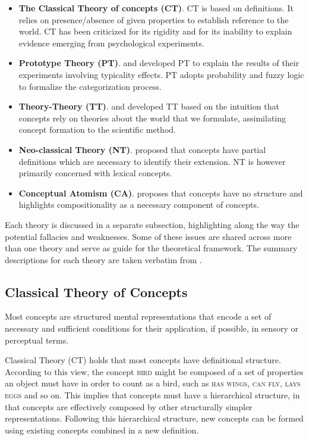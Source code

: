 \begin{itemize}
	\item \textbf{The Classical Theory of concepts (CT)}. CT is based on definitions. It relies on presence/absence of given properties to establish reference to the world. CT has been criticized for its rigidity and for its inability to explain evidence emerging from psychological experiments. 
	\item \textbf{Prototype Theory (PT)}. \cite{Rosch1978} and \cite{Smith1981} developed PT to explain the results of their experiments involving typicality effects. PT adopts probability and fuzzy logic to formalize the categorization process. 
	\item \textbf{Theory-Theory (TT)}. \cite{Murphy1985} and \cite{Carey1991, Carey2009} developed TT based on the intuition that concepts rely on theories about the world that we formulate, assimilating concept formation to the scientific method.
	\item \textbf{Neo-classical Theory (NT)}. \cite{Jackendoff1989} proposed that concepts have partial definitions which are necessary to identify their extension. NT is however primarily concerned with lexical concepts.
	\item \textbf{Conceptual Atomism (CA)}. \cite{Fodor2008} proposes that concepts have no structure and highlights  compositionality as a necessary component of concepts.
\end{itemize}

Each theory is discussed in a separate subsection, highlighting along the way the potential fallacies and weaknesses. Some of these issues are shared across more than one theory and serve as guide for the theoretical framework. The summary descriptions for each theory are taken verbatim from \cite{Laurence1999}.

\subsection{Classical Theory of Concepts}

\begin{mycolorbox}
	Most concepts are structured mental representations that encode a set of necessary and sufficient conditions for their application, if possible, in sensory or perceptual terms.
\end{mycolorbox}

Classical Theory (CT) holds that most concepts have definitional structure. According to this view, the concept \textsc{bird} might be composed of a set of properties an object must have in order to count as a bird, such as \textsc{has wings}, \textsc{can fly}, \textsc{lays eggs} and so on. This implies that concepts must have a hierarchical structure, in that concepts are effectively composed by other structurally simpler representations. Following this hierarchical structure, new concepts can be formed using existing concepts combined in a new definition.

